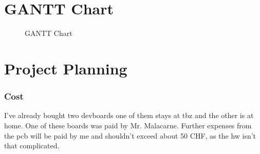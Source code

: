 \section{GANTT Chart}
\label{sec:GANTT Chart}
\begin{figure}[H]
	\centering
	\caption{GANTT Chart}
	\label{fig:GANTT Chart}
\end{figure}
\newpage

\section{Project Planning}
\label{sec:Project Planning}

\subsubsection{Cost}
I've already bought two \acs{devboard}s one of them stays at \acs{tbz} and the other is at home. One of these boards was paid by Mr. Malacarne. Further expenses from the \acs{pcb} will be paid by me and shouldn't exceed about 50 CHF, as the \acs{hw} isn't that complicated.

